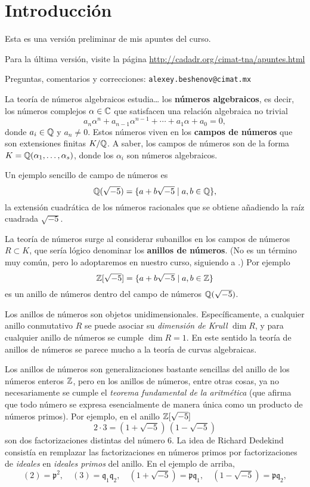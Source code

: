 \chapter*{Introducción}

\begin{framed}
  Esta es una versión preliminar de mis apuntes del curso.

  Para la última versión, visite la página
  \url{http://cadadr.org/cimat-tna/apuntes.html}

  Preguntas, comentarios y correcciones:
  \texttt{alexey.beshenov@cimat.mx}
\end{framed}

La teoría de números algebraicos estudia\dots{} los
\textbf{números algebraicos}, es decir, los números complejos $\alpha \in \mathbb{C}$
que satisfacen una relación algebraica no trivial
$$a_n \alpha^n + a_{n-1} \alpha^{n-1} + \cdots + a_1 \alpha + a_0 = 0,$$
donde $a_i \in \mathbb{Q}$ y $a_n \ne 0$. Estos números viven en
los \textbf{campos de números} que son extensiones finitas $K/\mathbb{Q}$.
A saber, los campos de números son de la forma $K = \mathbb{Q}
(\alpha_1,\ldots,\alpha_s)$, donde los $\alpha_i$ son números algebraicos.

Un ejemplo sencillo de campo de números es
$$\mathbb{Q} (\sqrt{-5}) = \{ a + b\sqrt{-5} \mid a,b \in \mathbb{Q} \},$$
la extensión cuadrática de los números racionales que se obtiene añadiendo la
raíz cuadrada $\sqrt{-5}$.

La teoría de números surge al considerar subanillos en los campos de números
$R \subset K$, que sería lógico denominar los \textbf{anillos de números}.
(No es un término muy común, pero lo adoptaremos en nuestro curso, siguiendo
a \cite{Stevenhagen-NR}.) Por ejemplo
$$\mathbb{Z} [\sqrt{-5}] = \{ a + b\sqrt{-5} \mid a,b \in \mathbb{Z} \}$$
es un anillo de números dentro del campo de números $\mathbb{Q} (\sqrt{-5})$.

Los anillos de números son objetos unidimensionales. Específicamente, a
cualquier anillo conmutativo $R$ se puede asociar su \emph{dimensión de Krull}
$\dim R$, y para cualquier anillo de números se cumple $\dim R = 1$. En este
sentido la teoría de anillos de números se parece mucho a la teoría de curvas
algebraicas.

Los anillos de números son generalizaciones bastante sencillas del anillo de los
números enteros $\mathbb{Z}$, pero en los anillos de números, entre otras cosas,
ya no necesariamente se cumple el \emph{teorema fundamental de la aritmética}
(que afirma que todo número se expresa esencialmente de manera única como un
producto de números primos). Por ejemplo, en el anillo $\mathbb{Z} [\sqrt{-5}]$
$$2\cdot 3 = (1 + \sqrt{-5})\,(1 - \sqrt{-5})$$
son dos factorizaciones distintas del número $6$. La idea de Richard Dedekind
consistía en remplazar las factorizaciones en números primos por factorizaciones
de \emph{ideales} en \emph{ideales primos} del anillo. En el ejemplo de arriba,
\[ (2) = \mathfrak{p}^2, \quad
   (3) = \mathfrak{q}_1 \mathfrak{q}_2, \quad
   (1 + \sqrt{-5}) = \mathfrak{p} \mathfrak{q}_1, \quad
   (1 - \sqrt{-5}) = \mathfrak{p} \mathfrak{q}_2, \]

